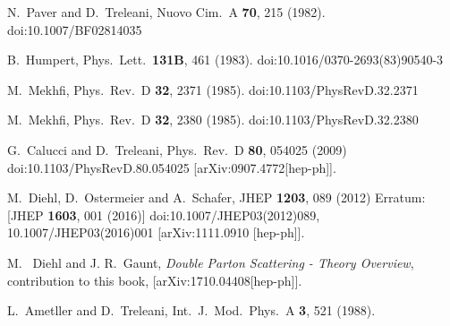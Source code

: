 \documentclass{ws-rv9x6}
\begin{document}
\begin{thebibliography}{9}

  N.~Paver and D.~Treleani,
  Nuovo Cim.\ A {\bf 70}, 215 (1982).
  doi:10.1007/BF02814035

  B.~Humpert,
  Phys.\ Lett.\  {\bf 131B}, 461 (1983).
  doi:10.1016/0370-2693(83)90540-3

  M.~Mekhfi,
  Phys.\ Rev.\ D {\bf 32}, 2371 (1985).
  doi:10.1103/PhysRevD.32.2371

  M.~Mekhfi,
  Phys.\ Rev.\ D {\bf 32}, 2380 (1985).
  doi:10.1103/PhysRevD.32.2380

  G.~Calucci and D.~Treleani,
  Phys.\ Rev.\ D {\bf 80}, 054025 (2009)
  doi:10.1103/PhysRevD.80.054025
  [arXiv:0907.4772[hep-ph]].

  M.~Diehl, D.~Ostermeier and A.~Schafer,
  JHEP {\bf 1203}, 089 (2012)
  Erratum: [JHEP {\bf 1603}, 001 (2016)]
  doi:10.1007/JHEP03(2012)089, 10.1007/JHEP03(2016)001
  [arXiv:1111.0910 [hep-ph]].

M.~ Diehl and J. R.~Gaunt, 
{\it Double Parton Scattering - Theory Overview}, contribution to this book, [arXiv:1710.04408[hep-ph]].

  L.~Ametller and D.~Treleani,
  Int.\ J.\ Mod.\ Phys.\  A {\bf 3}, 521 (1988).


\end{thebibliography}
\end{document}
